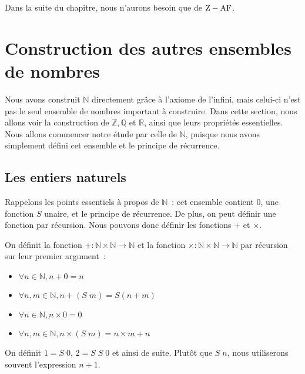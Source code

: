 Dans la suite du chapitre, nous n'aurons besoin que de $\mathrm Z - \operatorname{AF}$.

\section{Construction des autres ensembles de nombres}

Nous avons construit $\mathbb N$ directement grâce à l'axiome de l'infini, mais
celui-ci n'est pas le seul ensemble de nombres important à construire. Dans
cette section, nous allons voir la construction de $\mathbb Z, \mathbb Q$ et
$\mathbb R$, ainsi que leurs propriétés essentielles. Nous allons commencer
notre étude par celle de $\mathbb N$, puisque nous avons simplement défini cet
ensemble et le principe de récurrence.

\subsection{Les entiers naturels}

Rappelons les points essentiels à propos de $\mathbb N$~: cet ensemble contient
$0$, une fonction $S$ unaire, et le principe de récurrence. De plus, on peut
définir une fonction par récursion. Nous pouvons donc définir les fonctions
$+$ et $\times$.

\begin{definition}
  On définit la fonction $+ : \mathbb N \times \mathbb N \to \mathbb N$ et la
  fonction $\times : \mathbb N \times \mathbb N \to \mathbb N$ par récursion
  sur leur premier argument~:
  \begin{itemize}
  \item $\forall n \in \mathbb N, n + 0 = n$
  \item $\forall n,m\in \mathbb N, n + (S\;m) = S(n + m)$
  \item $\forall n \in \mathbb N, n \times 0 = 0$
  \item $\forall n,m\in\mathbb N, n \times (S\;m) = n\times m + n$
  \end{itemize}
\end{definition}

\begin{notation}
  On définit $1 = S\;0$, $2 = S\;S\;0$ et ainsi de suite. Plutôt que $S\;n$,
  nous utiliserons souvent l'expression $n + 1$.
\end{notation}

